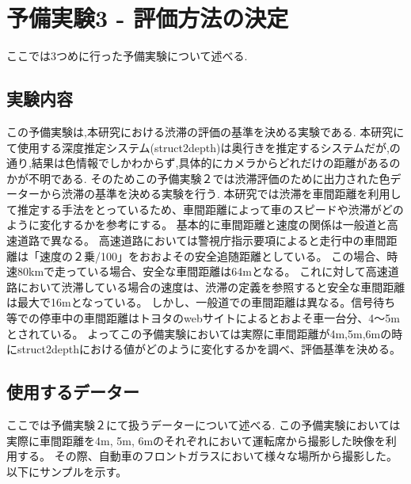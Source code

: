 \newpage
\section{予備実験3 - 評価方法の決定}
ここでは3つめに行った予備実験について述べる.
\subsection{実験内容}
この予備実験は,本研究における渋滞の評価の基準を決める実験である.
本研究にて使用する深度推定システム(struct2depth)\cite{casser2019struct2depth}は奥行きを推定するシステムだが,の通り,結果は色情報でしかわからず,具体的にカメラからどれだけの距離があるのかが不明である.
そのためこの予備実験２では渋滞評価のために出力された色データーから渋滞の基準を決める実験を行う.
本研究では渋滞を車間距離を利用して推定する手法をとっているため、車間距離によって車のスピードや渋滞がどのように変化するかを参考にする。
基本的に車間距離と速度の関係は一般道と高速道路で異なる。
高速道路においては警視庁指示要項によると走行中の車間距離は「速度の２乗/100」をおおよその安全追随距離としている\cite{highway}。
この場合、時速80kmで走っている場合、安全な車間距離は64mとなる。
これに対して高速道路において渋滞している場合の速度は、渋滞の定義を参照すると安全な車間距離は最大で16mとなっている。
しかし、一般道での車間距離は異なる。信号待ち等での停車中の車間距離はトヨタのwebサイトによるとおよそ車一台分、4〜5mとされている\cite{toyota_web}。
よってこの予備実験においては実際に車間距離が4m,5m,6mの時にstruct2depthにおける値がどのように変化するかを調べ、評価基準を決める。


\subsection{使用するデーター}
ここでは予備実験２にて扱うデーターについて述べる.
この予備実験においては実際に車間距離を4m, 5m, 6mのそれぞれにおいて運転席から撮影した映像を利用する。
その際、自動車のフロントガラスにおいて様々な場所から撮影した。以下にサンプルを示す。


